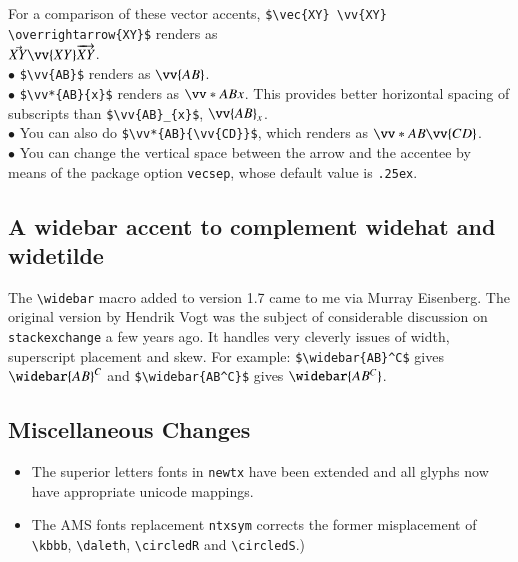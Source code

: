 \documentclass[\fsc]{article}
\theoremstyle{oldplain}
\theoremstyle{plain}
\begin{document}
For a comparison of these vector accents, \verb|$\vec{XY} \vv{XY} \overrightarrow{XY}$| renders as\\ 
$\vec{XY} \vv{XY} \overrightarrow{XY}$.\\ 
$\bullet$ \verb|$\vv{AB}$|  renders as $\vv{AB}$.\\ 
$\bullet$ \verb|$\vv*{AB}{x}$| renders as $\vv*{AB}{x}$. This provides better horizontal spacing of subscripts than \verb|$\vv{AB}_{x}$|, $\vv{AB}_{x}$.\\
$\bullet$  You can also do \verb|$\vv*{AB}{\vv{CD}}$|, which  renders as $\vv*{AB}{\vv{CD}}$.\\
$\bullet$ You can change the vertical space between the arrow and the accentee by means of the package option {\tt vecsep}, whose default value is {\tt .25ex}.

\subsection{A widebar accent to complement widehat and  widetilde}
The \verb|\widebar| macro added to version 1.7 came to me via Murray Eisenberg. The original version by Hendrik Vogt  was the subject  of considerable discussion on {\tt stackexchange} a few years ago. It  handles very cleverly issues of width, superscript placement and skew. For example: \verb|$\widebar{AB}^C$| gives $\widebar{AB}^C$ and \verb|$\widebar{AB^C}$| gives $\widebar{AB^C}$.
\subsection{Miscellaneous Changes}
\begin{itemize}
\item
The superior letters fonts in {\tt newtx} 
have been extended and all glyphs now have appropriate unicode mappings.
\item
The AMS fonts replacement {\tt ntxsym} corrects the former misplacement of \verb|\kbbb|, \verb|\daleth|, \verb|\circledR| and \verb|\circledS|.)
\end{itemize}
\end{document}
